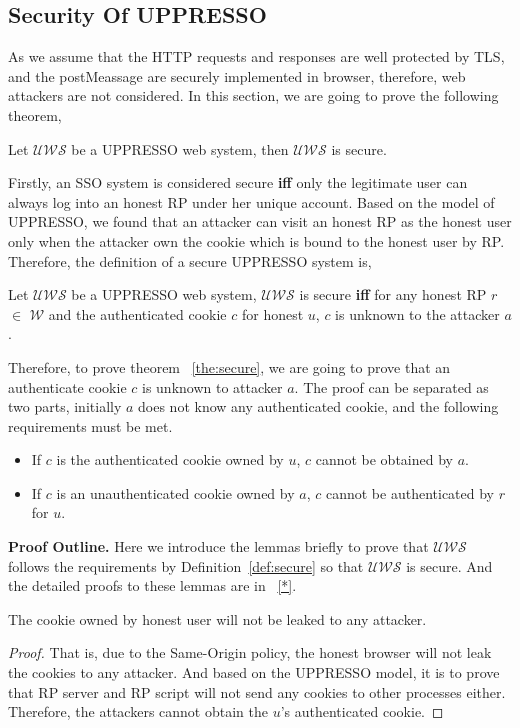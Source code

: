 \subsection{Security Of UPPRESSO}
As we assume that the HTTP requests and responses are well protected by TLS, and the postMeassage are securely implemented in browser, therefore, web attackers are not considered.
In this section, we are going to prove the following theorem,
\begin{theorem}
Let $\mathcal{UWS}$ be a UPPRESSO web system, then $\mathcal{UWS}$ is secure. 
\label{the:secure}
\end{theorem}
Firstly, an SSO system is considered secure \textbf{iff} only the legitimate user can always log into an honest RP under her unique account. Based on the model of UPPRESSO, we found that  an attacker can visit an honest RP as the honest user only when the attacker own the cookie which is bound to the honest user by RP. Therefore, the definition of a secure UPPRESSO system is, 
\begin{definition}
Let $\mathcal{UWS}$ be a UPPRESSO web system, $\mathcal{UWS}$ is secure \textbf{iff} for any honest RP $r$ $\in $ $\mathcal{W}$ and  the authenticated cookie $c$ for honest $u$,  $c$ is unknown to the attacker $a$. 
\label{def:secure}
\end{definition}
Therefore, to prove theorem ~\ref{the:secure}, we are going to prove that an authenticate cookie $c$ is unknown to attacker $a$. The proof can be separated as two parts, initially $a$ does not know any authenticated cookie, and the following requirements must be met.
\begin{itemize}
\item If $c$ is the authenticated cookie owned by $u$, $c$ cannot be obtained by $a$.
\item If $c$ is an unauthenticated cookie owned by $a$, $c$ cannot be authenticated by $r$ for $u$. 
\end{itemize}



\vspace{1mm}\noindent\textbf{Proof Outline. } 
Here we introduce the lemmas briefly to prove that $\mathcal{UWS}$ follows the requirements by Definition~\ref{def:secure} so that $\mathcal{UWS}$ is secure. And the detailed proofs to these lemmas are in ~\ref{*}.

\begin{lemma}
The cookie owned by honest user will not be leaked to any attacker.
\label{lemma:cookie}
\end{lemma}
\begin{proof}
That is, due to the Same-Origin policy, the honest browser will not leak the cookies to any attacker. And based on the UPPRESSO model, it is to prove that RP server and RP script will not send any cookies to other processes either. Therefore, the attackers cannot obtain the $u$'s authenticated  cookie. 
\end{proof}


